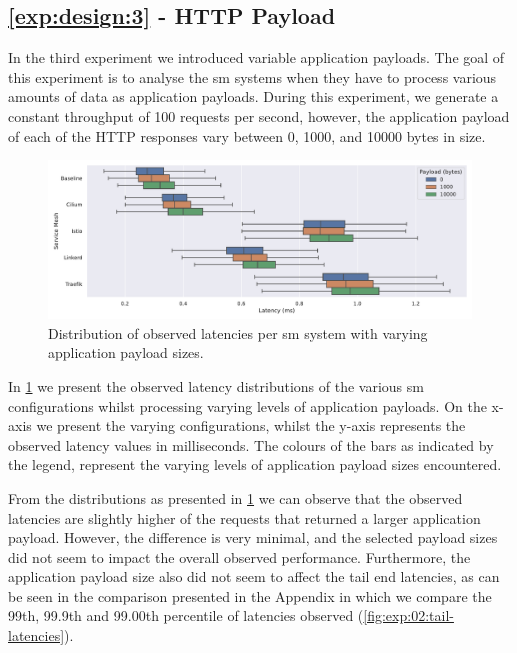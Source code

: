 \subsection{\ref{exp:design:3} - HTTP Payload}
\label{sec:experiments:results:per-experiment:03}

In the third experiment we introduced variable application payloads. The goal of this experiment is to analyse the \gls{sm} systems when they have to process various amounts of data as application payloads. During this experiment, we generate a constant throughput of 100 requests per second, however, the application payload of each of the HTTP responses vary between 0, 1000, and 10000 bytes in size. 


\begin{figure}[!t]
    \centering
    
    \includegraphics[width=\textwidth]{5_experimental_evaluation/figures/exp-03-latencies-all.pdf}

   \caption[Distribution of observed latencies per \gls{sm} system with varying application payload sizes]{Distribution of observed latencies per \gls{sm} system with varying application payload sizes.}
    
    \label{fig:exp:result:03:latency}
\end{figure}

In \cref{fig:exp:result:03:latency} we present the observed latency distributions of the various \gls{sm} configurations whilst processing varying levels of application payloads. On the x-axis we present the varying configurations, whilst the y-axis represents the observed latency values in milliseconds. The colours of the bars as indicated by the legend, represent the varying levels of application payload sizes encountered.

From the distributions as presented in \cref{fig:exp:result:03:latency} we can observe that the observed latencies are slightly higher of the requests that returned a larger application payload. However, the difference is very minimal, and the selected payload sizes did not seem to impact the overall observed performance. Furthermore, the application payload size also did not seem to affect the tail end latencies, as can be seen in the comparison presented in the Appendix in which we compare the 99th, 99.9th and 99.00th percentile of latencies observed (\cref{fig:exp:02:tail-latencies}).


